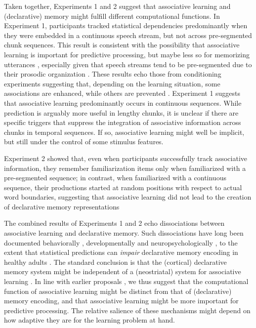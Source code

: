 \documentclass[
]{article}
\begin{document}
Taken together, Experiments 1 and 2 suggest that associative learning
and (declarative) memory might fulfill different computational
functions. In Experiment 1, participants tracked statistical
dependencies predominantly when they were embedded in a continuous
speech stream, but not across pre-segmented chunk sequences. This result
is consistent with the possibility that associative learning is
important for predictive processing, but maybe less so for memorizing
utterances \citep{Turk-Browne2010, Sherman2020}, especially given that
speech streams tend to be pre-segmented due to their prosodic
organization
\citep{Cutler1997, Shattuck-Hufnagel1996, Brentari2011, Endress-cross-seg, Fenlon2008, Pilon1981, Christophe2001}.
These results echo those from conditioning experiments suggesting that,
depending on the learning situation, some associations are enhanced,
while others are prevented
\citep{Alberts1984, Garcia1974, Garcia1976, Gubernick1984, Martin1979}.
Experiment 1 suggests that associative learning predominantly occurs in
continuous sequences. While prediction is arguably more useful in
lengthy chunks, it is unclear if there are specific triggers that
suppress the integration of associative information across chunks in
temporal sequences. If so, associative learning might well be implicit,
but still under the control of some stimulus features.

Experiment 2 showed that, even when participants successfully track
associative information, they remember familiarization items only when
familiarized with a pre-segmented sequence; in contrast, when
familiarized with a continuous sequence, their productions started at
random positions with respect to actual word boundaries, suggesting that
associative learning did not lead to the creation of declarative memory
representations

The combined results of Experiments 1 and 2 echo dissociations between
associative learning and declarative memory. Such dissociations have
long been documented behaviorally \citep{Graf1984}, developmentally
\citep{Finn2016} and neuropsychologically
\citep{Cohen1980, Knowlton1996a, Rungratsameetaweemana2019, Poldrack2001, Squire1992},
to the extent that statistical predictions can \emph{impair} declarative
memory encoding in healthy adults \citep{Sherman2020}. The standard
conclusion is that the (cortical) declarative memory system might be
independent of a (neostriatal) system for associative learning
\citep{Knowlton1996a, Poldrack2001, Squire1992}. In line with earlier
proposals \citep{Goujon2015, Turk-Browne2010, Sherman2020}, we thus
suggest that the computational function of associative learning might be
distinct from that of (declarative) memory encoding, and that
associative learning might be more important for predictive processing.
The relative salience of these mechanisms might depend on how adaptive
they are for the learning problem at hand.
\end{document}

